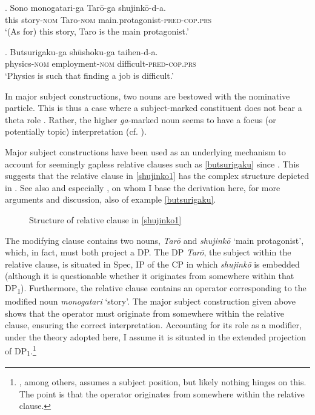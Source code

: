 \exg. Sono monogatari-ga Tarō-ga shujinkō-d-a.\\
this story-\textsc{nom} Taro-\textsc{nom} main.protagonist-\textsc{pred-cop.prs}\\
`(As for) this story, Taro is the main protagonist.’ \label{shujinkodouble}

\exg. Butsurigaku-ga shūshoku-ga taihen-d-a.\\
physics-\textsc{nom} employment-\textsc{nom} difficult-\textsc{pred-cop.prs}\\
`Physics is such that finding a job is difficult.’ \label{butsurigakudouble}

In major subject constructions, two nouns are bestowed with the nominative particle. This is thus a case where a subject-marked constituent does not bear a theta role \citep{heycock:1993:syntactic}. Rather, the higher \textit{ga}-marked noun seems to have a focus (or potentially topic) interpretation (cf. \citealt{vermeulen:2005:poss}).

Major subject constructions have been used as an underlying mechanism to account for seemingly gapless relative clauses such as \ref{butsurigaku} since \citet{kuroda:1992:japanese}. This suggests that the relative clause in \ref{shujinko1} has the complex structure depicted in . See also \citet{heycock:1993:syntactic} and especially \citet{miyamoto:2017:RC}, on whom I base the derivation here, for more arguments and discussion, also of example \ref{butsurigaku}.

\begin{figure}
\centering
{}
\caption{Structure of relative clause in \ref{shujinko1}}
\label{Structure major subject}
\end{figure}

\largerpage
The modifying clause contains two nouns, \textit{Tarō} and \textit{shujinkō} `main protagonist’, which, in fact, must both project a DP. The DP \textit{Tarō}, the subject within the relative clause, is situated in Spec, IP of the CP in which \textit{shujinkō} is embedded (although it is questionable whether it originates from somewhere within that DP\textsubscript{1}). Furthermore, the relative clause contains an operator corresponding to the modified noun \textit{monogatari} `story’. The major subject construction given above shows that the operator must originate from somewhere within the relative clause, ensuring the correct interpretation. Accounting for its role as a modifier, under the theory adopted here, I assume it is situated in the extended projection of DP\textsubscript{1}.\footnote{\citet{miyamoto:2017:RC}, among others, assumes a subject position, but likely nothing hinges on this. The point is that the operator originates from somewhere within the relative clause.}

